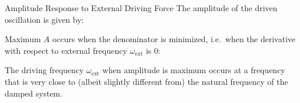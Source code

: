 \documentclass[12pt,compress,aspectratio=169]{beamer}
\begin{document}
\begin{frame}{Amplitude Response to External Driving Force}
  The amplitude of the driven oscillation is given by:
  
  
  Maximum $A$ occurs when the denominator is minimized, i.e.\ when the
  derivative with respect to external frequency $\omega_\text{ext}$ is 0:


  The driving frequency $\omega_\text{ext}$ when amplitude is maximum occurs at a
  frequency that is very close to (albeit slightly different from) the natural
  frequency of the damped system.
\end{frame}
\end{document}
